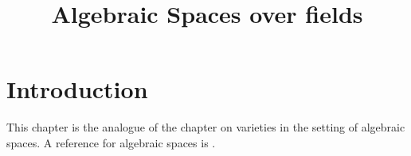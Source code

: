 

%


\title{Algebraic Spaces over fields}


\maketitle

\label{section-phantom}

\tableofcontents

\section{Introduction}
\label{section-introduction}

\noindent
This chapter is the analogue of the chapter on varieties in the setting
of algebraic spaces. A reference for algebraic spaces is
\cite{K}.

















